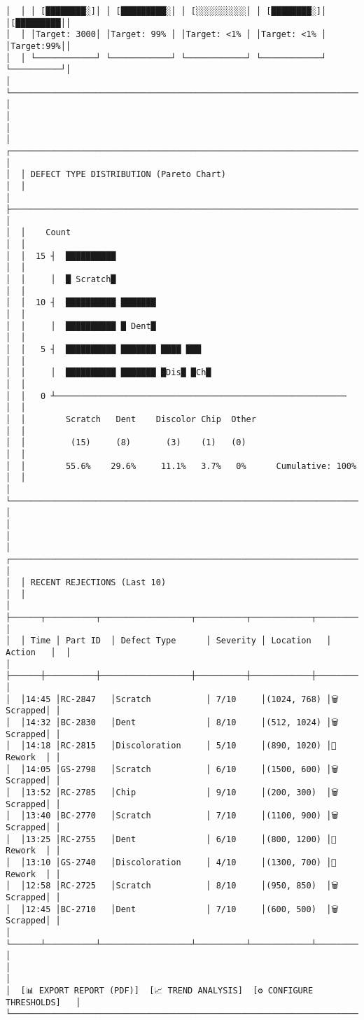 \documentclass[
]{article}
\begin{document}
\begin{verbatim}
│  │ │ [████████░]│ │ [█████████░│ │ [░░░░░░░░░░│ │ [████████░]│ │[█████████││
│  │ │Target: 3000│ │Target: 99% │ │Target: <1% │ │Target: <1% │ │Target:99%││
│  │ └────────────┘ └────────────┘ └────────────┘ └────────────┘ └──────────┘│
│  └────────────────────────────────────────────────────────────────────────┘  │
│                                                                                │
│  ┌────────────────────────────────────────────────────────────────────────┐  │
│  │ DEFECT TYPE DISTRIBUTION (Pareto Chart)                                │  │
│  ├────────────────────────────────────────────────────────────────────────┤  │
│  │    Count                                                                │  │
│  │  15 ┤  ██████████                                                       │  │
│  │     │  █ Scratch█                                                       │  │
│  │  10 ┤  ██████████ ███████                                               │  │
│  │     │  ██████████ █ Dent█                                               │  │
│  │   5 ┤  ██████████ ███████ ████ ███                                     │  │
│  │     │  ██████████ ███████ █Dis█ █Ch█                                   │  │
│  │   0 ┴──────────────────────────────────────────────────────────        │  │
│  │        Scratch   Dent    Discolor Chip  Other                          │  │
│  │         (15)     (8)       (3)    (1)   (0)                             │  │
│  │        55.6%    29.6%     11.1%   3.7%   0%      Cumulative: 100%      │  │
│  └────────────────────────────────────────────────────────────────────────┘  │
│                                                                                │
│  ┌────────────────────────────────────────────────────────────────────────┐  │
│  │ RECENT REJECTIONS (Last 10)                                            │  │
│  ├──────┬──────────┬──────────────────┬──────────┬────────────┬──────────┤  │
│  │ Time │ Part ID  │ Defect Type      │ Severity │ Location   │ Action   │  │
│  ├──────┼──────────┼──────────────────┼──────────┼────────────┼──────────┤  │
│  │14:45 │RC-2847   │Scratch           │ 7/10     │(1024, 768) │🗑 Scrapped│ │
│  │14:32 │BC-2830   │Dent              │ 8/10     │(512, 1024) │🗑 Scrapped│ │
│  │14:18 │RC-2815   │Discoloration     │ 5/10     │(890, 1020) │🔄 Rework  │ │
│  │14:05 │GS-2798   │Scratch           │ 6/10     │(1500, 600) │🗑 Scrapped│ │
│  │13:52 │RC-2785   │Chip              │ 9/10     │(200, 300)  │🗑 Scrapped│ │
│  │13:40 │BC-2770   │Scratch           │ 7/10     │(1100, 900) │🗑 Scrapped│ │
│  │13:25 │RC-2755   │Dent              │ 6/10     │(800, 1200) │🔄 Rework  │ │
│  │13:10 │GS-2740   │Discoloration     │ 4/10     │(1300, 700) │🔄 Rework  │ │
│  │12:58 │RC-2725   │Scratch           │ 8/10     │(950, 850)  │🗑 Scrapped│ │
│  │12:45 │BC-2710   │Dent              │ 7/10     │(600, 500)  │🗑 Scrapped│ │
│  └──────┴──────────┴──────────────────┴──────────┴────────────┴──────────┘  │
│                                                                                │
│  [📊 EXPORT REPORT (PDF)]  [📈 TREND ANALYSIS]  [⚙️ CONFIGURE THRESHOLDS]   │
└────────────────────────────────────────────────────────────────────────────────┘
\end{verbatim}
\end{document}
